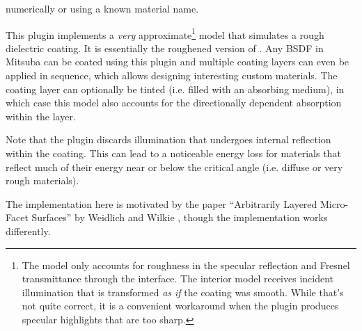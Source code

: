 {{     numerically or using a known material name. }
}

This plugin implements a \emph{very} approximate\footnote{
The model only accounts for roughness
in the specular reflection and Fresnel transmittance through the interface.
The interior model receives incident illumination
that is transformed \emph{as if} the coating was smooth. While
that's not quite correct, it is a convenient workaround when the
 plugin produces specular highlights that are too sharp.}
model that simulates a rough dielectric coating. It is essentially the
roughened version of .
Any BSDF in Mitsuba can be coated using this plugin and multiple coating
layers can even be applied in sequence, which allows designing interesting
custom materials. The coating layer can optionally be tinted (i.e. filled
with an absorbing medium), in which case this model also accounts for the
directionally dependent absorption within the layer.

Note that the plugin discards illumination that undergoes internal
reflection within the coating. This can lead to a noticeable energy
loss for materials that reflect much of their energy near or below the critical
angle (i.e. diffuse or very rough materials).

The implementation here is motivated by the paper
``Arbitrarily Layered Micro-Facet Surfaces'' by Weidlich and
Wilkie \cite{Weidlich2007Arbitrarily}, though the implementation
works differently.

